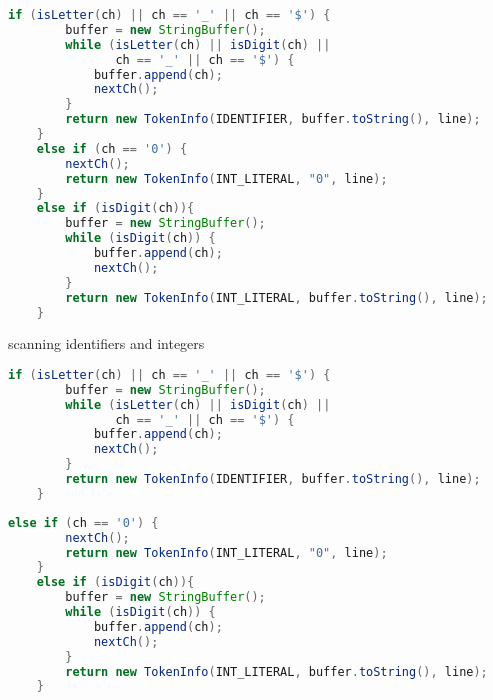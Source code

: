 \documentclass[8pt,a4paper,compress]{beamer}
\begin{document}
\begin{frame}[fragile]
\pause

\begin{overprint}
\begin{tcolorbox}[enhanced,drop shadow southwest,sharp corners,size=fbox,colback=white,fontlower=\small\ttfamily,collower=silver900]

\begin{lstlisting}[language=Java,style=focusin]
    if (isLetter(ch) || ch == '_' || ch == '$') {
        buffer = new StringBuffer();
        while (isLetter(ch) || isDigit(ch) || 
               ch == '_' || ch == '$') {
            buffer.append(ch);
            nextCh();
        }
        return new TokenInfo(IDENTIFIER, buffer.toString(), line);
    }
    else if (ch == '0') {
        nextCh();
        return new TokenInfo(INT_LITERAL, "0", line);
    }
    else if (isDigit(ch)){
        buffer = new StringBuffer();
        while (isDigit(ch)) {
            buffer.append(ch);
            nextCh();
        }
        return new TokenInfo(INT_LITERAL, buffer.toString(), line);
    }
\end{lstlisting}

\tcblower
\begin{minipage}[t][.25cm][t]{\textwidth}
scanning identifiers and integers
\end{minipage}
\end{tcolorbox}

\begin{tcolorbox}[enhanced,drop shadow southwest,sharp corners,size=fbox,colback=white,fontlower=\small\ttfamily,collower=silver900]

\begin{lstlisting}[language=Java,style=focusin,backgroundcolor=\color{lime100}]
    if (isLetter(ch) || ch == '_' || ch == '$') {
        buffer = new StringBuffer();
        while (isLetter(ch) || isDigit(ch) || 
               ch == '_' || ch == '$') {
            buffer.append(ch);
            nextCh();
        }
        return new TokenInfo(IDENTIFIER, buffer.toString(), line);
    }
\end{lstlisting}
\begin{lstlisting}[language=Java,style=focusout]
    else if (ch == '0') {
        nextCh();
        return new TokenInfo(INT_LITERAL, "0", line);
    }
    else if (isDigit(ch)){
        buffer = new StringBuffer();
        while (isDigit(ch)) {
            buffer.append(ch);
            nextCh();
        }
        return new TokenInfo(INT_LITERAL, buffer.toString(), line);
    }
\end{lstlisting}


\end{tcolorbox}
\end{overprint}
\end{frame}
\end{document}
